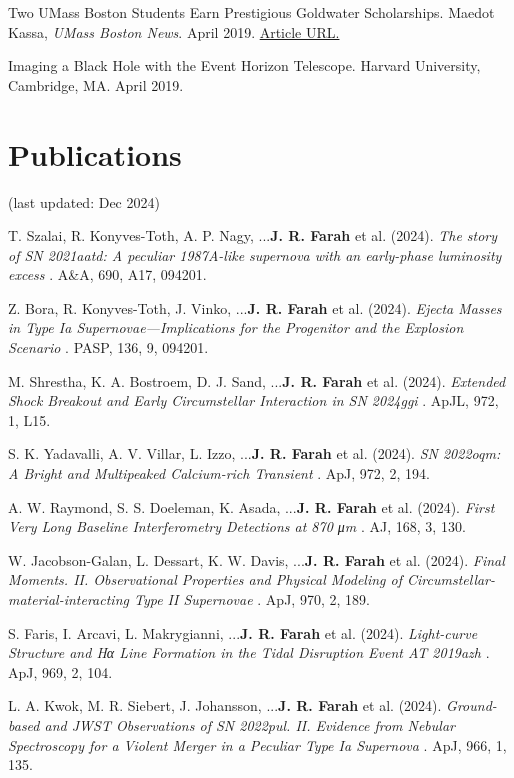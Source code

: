 \documentclass[margin,line]{res}
\begin{document}
\begin{resume}
Two UMass Boston Students Earn Prestigious Goldwater Scholarships. Maedot Kassa, \textit{UMass Boston News}. April 2019. {\color{blue}\href{https://www.umb.edu/news/detail/two_umass_boston_students_earn_prestigious_goldwater_scholarships}{Article URL.}}


Imaging a Black Hole with the Event Horizon Telescope. Harvard University, Cambridge, MA. April
2019.




\vspace{+.4cm}
\section{\sc Publications} 
\label{sec:publications}

(last updated: Dec 2024)

T. Szalai, R. Konyves-Toth, A. P. Nagy, ...\textbf{J. R. Farah} et al. (2024). \textit{ The story of SN 2021aatd: A peculiar 1987A-like supernova with an early-phase luminosity excess }. A\&A, 690, A17, 094201.

Z. Bora, R. Konyves-Toth, J. Vinko, ...\textbf{J. R. Farah} et al. (2024). \textit{ Ejecta Masses in Type Ia Supernovae—Implications for the Progenitor and the Explosion Scenario }. PASP, 136, 9, 094201.

M. Shrestha, K. A. Bostroem, D. J. Sand, ...\textbf{J. R. Farah} et al. (2024). \textit{ Extended Shock Breakout and Early Circumstellar Interaction in SN 2024ggi }. ApJL, 972, 1, L15.

S. K. Yadavalli, A. V. Villar, L. Izzo, ...\textbf{J. R. Farah} et al. (2024). \textit{ SN 2022oqm: A Bright and Multipeaked Calcium-rich Transient }. ApJ, 972, 2, 194.

A. W. Raymond, S. S. Doeleman, K. Asada, ...\textbf{J. R. Farah} et al. (2024). \textit{ First Very Long Baseline Interferometry Detections at 870 μm }. AJ, 168, 3, 130.

W. Jacobson-Galan, L. Dessart, K. W. Davis, ...\textbf{J. R. Farah} et al. (2024). \textit{  Final Moments. II. Observational Properties and Physical Modeling of Circumstellar-material-interacting Type II Supernovae }. ApJ, 970, 2, 189.

S. Faris, I. Arcavi, L. Makrygianni, ...\textbf{J. R. Farah} et al. (2024). \textit{  Light-curve Structure and Hα Line Formation in the Tidal Disruption Event AT 2019azh }. ApJ, 969, 2, 104.

L. A. Kwok, M. R. Siebert, J. Johansson, ...\textbf{J. R. Farah} et al. (2024). \textit{ Ground-based and JWST Observations of SN 2022pul. II. Evidence from Nebular Spectroscopy for a Violent Merger in a Peculiar Type Ia Supernova }. ApJ, 966, 1, 135.


\end{resume}
\end{document}

